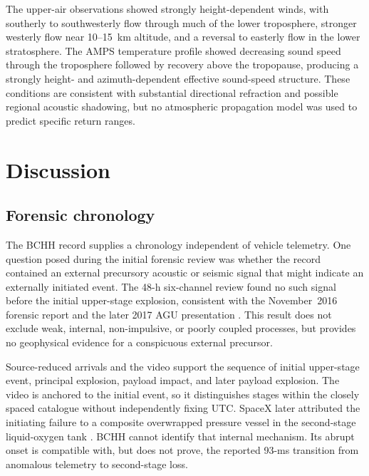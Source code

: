 \documentclass[]{seismica}
\begin{document}
The upper-air observations showed strongly height-dependent winds, with
southerly to southwesterly flow through much of the lower troposphere, stronger
westerly flow near 10--15~km altitude, and a reversal to easterly flow in the
lower stratosphere. The AMPS temperature profile showed decreasing sound speed
through the troposphere followed by recovery above the tropopause, producing a
strongly height- and azimuth-dependent effective sound-speed structure. These
conditions are consistent with substantial directional refraction and possible
regional acoustic shadowing, but no atmospheric propagation model was used to
predict specific return ranges.

\FloatBarrier

\section{Discussion}
\label{sec:discussion}

\subsection{Forensic chronology}

The BCHH record supplies a chronology independent of vehicle telemetry. One
question posed during the initial forensic review was whether the record
contained an external precursory acoustic or seismic signal that might indicate
an externally initiated event. The 48-h six-channel review found no such signal
before the initial upper-stage explosion, consistent with the November~2016
forensic report \citep{thompson_mcnutt_fireball_2016} and the later 2017 AGU
presentation \citep{thompson_agu_falcon9_2017}. This result does not exclude
weak, internal, non-impulsive, or poorly coupled processes, but provides no
geophysical evidence for a conspicuous external precursor.

Source-reduced arrivals and the video support the sequence of initial
upper-stage event, principal explosion, payload impact, and later payload
explosion. The video is anchored to the initial event, so it distinguishes
stages within the closely spaced catalogue without independently fixing UTC.
SpaceX later attributed the initiating failure to a composite overwrapped
pressure vessel in the second-stage liquid-oxygen tank
\citep{spacex_anomaly_2017,nasa_sma_falcon9}. BCHH cannot identify that
internal mechanism. Its abrupt onset is compatible with, but does not prove,
the reported 93-ms transition from anomalous telemetry to second-stage loss.
\end{document}
